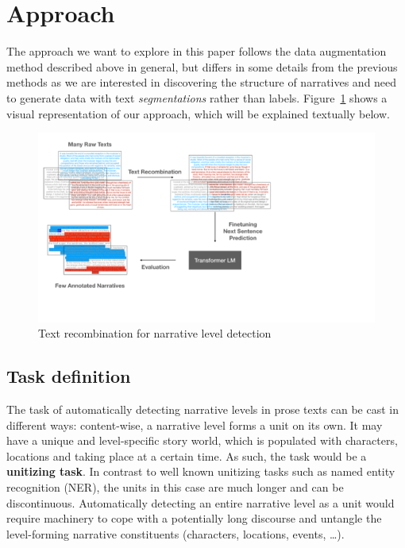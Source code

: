 \documentclass[10pt, a4paper]{article}
\begin{document}
\section{Approach}
\label{sec:workflow}

The approach we want to explore in this paper follows the  data augmentation method described above in general, but differs in some details from the previous methods as we are interested in discovering the structure of narratives and need to generate data with text \textit{segmentations} rather than labels. Figure~\ref{fig:workflow} shows a visual representation of our approach, which will be explained textually below.

\begin{figure}
    \centering
    \includegraphics[width=\linewidth]{workflow.pdf}
    \caption{Text recombination for narrative level detection}
    \label{fig:workflow}
\end{figure}



\subsection{Task definition}
\label{subsec:task}

The task of automatically detecting narrative levels in prose texts can be cast in different ways: content-wise, a narrative level forms a unit on its own. It may have a unique and level-specific story world, which is populated with characters, locations and taking place at a certain time. As such, the task would be a \textbf{unitizing task}. In contrast to well known unitizing tasks such as named entity recognition (NER), the units in this case are much longer and can be discontinuous. Automatically detecting an entire narrative level as a unit would require machinery to cope with a potentially long discourse and untangle the level-forming narrative constituents (characters, locations, events, \dots). 
\end{document}
